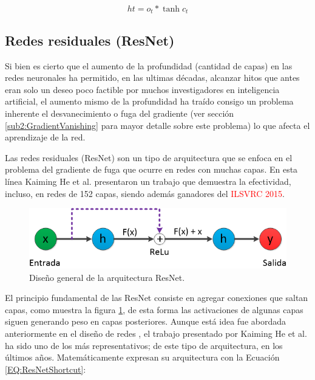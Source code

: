             \begin{equation}
                \label{EQ:LSTM_Output}
                ht = o_t * \tanh{c_t}
            \end{equation}
        
    \subsection{Redes residuales (ResNet)}
    \label{sub:FrameResNet}
    
        Si bien es cierto que el aumento de la profundidad (cantidad de capas) en las redes neuronales ha permitido, en las ultimas décadas, alcanzar hitos que antes eran solo un deseo poco factible por muchos investigadores en inteligencia artificial, el aumento mismo de la profundidad ha traído consigo un problema inherente el desvanecimiento o fuga del gradiente (ver sección \ref{sub2:GradientVanishing} para mayor detalle sobre este problema) lo que afecta el aprendizaje de la red.
    
        Las redes residuales (ResNet) son un tipo de arquitectura que se enfoca en el problema del gradiente de fuga que ocurre en redes con muchas capas. En esta línea Kaiming He et al. \cite{Kaiming2015} presentaron un trabajo que demuestra la efectividad, incluso, en redes de 152 capas, siendo además ganadores del \textcolor{red}{ILSVRC 2015}.
            
        \begin{figure}[ht!]
        	\centering
        	\includegraphics[width=0.7\linewidth]{imgs/02-Referential/02-arch-resnet.png}
        	\caption[Diseño general de la arquitectura ResNet]{Diseño general de la arquitectura ResNet.}
    	    \label{fig:ResNet}
        \end{figure}%
        
        El principio fundamental de las ResNet consiste en agregar conexiones que saltan capas, como muestra la figura \ref{fig:ResNet}, de esta forma las activaciones de algunas capas siguen generando peso en capas posteriores. Aunque está idea fue abordada anteriormente en el diseño de redes \cite{Schraudolph1998}, el trabajo presentado por Kaiming He et al. \cite{Kaiming2015} ha sido uno de los más representativos; de este tipo de arquitectura, en los últimos años. Matemáticamente expresan su arquitectura con la Ecuación \ref{EQ:ResNetShortcut}:
        
